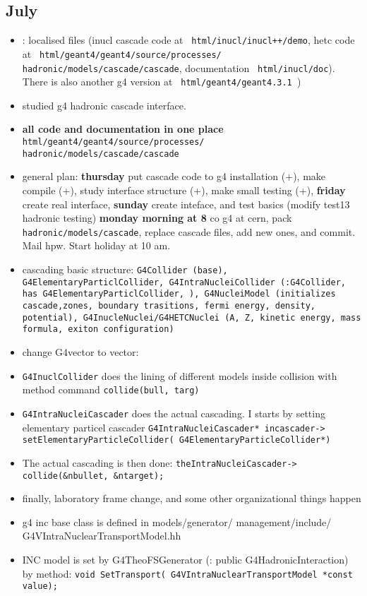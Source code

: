 \subsection{July}
\begin{itemize}
\item {\bf}: localised files (inucl cascade code at {\tt
    html/inucl/inucl++/demo}, hetc code at {\tt
    html/geant4/geant4/source/processes/
    hadronic/models/cascade/cascade}, documentation {\tt
    html/inucl/doc}).  There is also another g4 version at {\tt
    html/geant4/geant4.3.1 })
\item studied g4 hadronic cascade interface.
\item {\bf all code and documentation in one place} {\tt
    html/geant4/geant4/source/processes/
    hadronic/models/cascade/cascade}
\item general plan: {\bf thursday} put cascade code to g4 installation
  (+), make compile (+), study interface structure (+), make small
  testing (+), {\bf friday} create real interface, {\bf sunday} create
  inteface, and test basics (modify test13 hadronic testing) {\bf
    monday morning at 8} co g4 at cern, pack {\tt
    hadronic/models/cascade}, replace cascade files, add new ones, and
  commit. Mail hpw. Start holiday at 10 am.
\item cascading basic structure: {\tt G4Collider (base),
    G4ElementaryParticlCollider, G4IntraNucleiCollider (:G4Collider,
    has G4ElementaryParticlCollider, ), G4NucleiModel (initializes
    cascade,zones, boundary trasitions, fermi energy, density,
    potential), G4InucleNuclei/G4HETCNuclei (A, Z, kinetic energy,
    mass formula, exiton configuration) }
\item change G4vector to vector:
\item {\tt G4InuclCollider} does the lining of different models inside
  collision with method command {\tt collide(bull, targ)}
\item {\tt G4IntraNucleiCascader} does the actual cascading. I starts
  by setting elementary particel cascader {\tt G4IntraNucleiCascader*
    incascader-> setElementaryParticleCollider(
    G4ElementaryParticleCollider*)}
\item The actual cascading is then done: {\tt theIntraNucleiCascader->
    collide(\&nbullet, \&ntarget);}
\item finally, laboratory frame change, and some other organizational
  things happen
\item g4 inc base class is defined in models/generator/
  management/include/ G4VIntraNuclearTransportModel.hh
\item INC model is set by G4TheoFSGenerator (: public
  G4HadronicInteraction) by method: {\tt void SetTransport(
    G4VIntraNuclearTransportModel *const value);}

\end{itemize}

